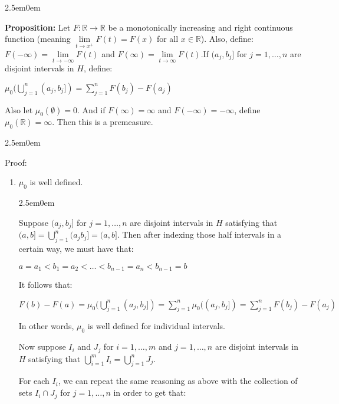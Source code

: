 \documentclass{book}
\newcommand{\hTwo}{%
\color{MidnightBlue}%
   \fontsize{13}{15}\selectfont%
}
\newcommand{\hThree}{%
   \color{PineGreen!85!Orange}
   \fontsize{12}{14}\selectfont%
}
\newcommand{\hFour}{%
   \color{Cyan!80!black}
   \fontsize{12}{14}\selectfont%
}
\newenvironment{myIndent}{%
   \begin{adjustwidth}{2.5em}{0em}%
}{%
   \end{adjustwidth}%
}
\newcommand{\blab}[1]{\textbf{#1}}
\newcommand{\retTwo}{\hfill\bigbreak}
\begin{document}
\begin{myIndent}\hTwo
   \blab{Proposition:} Let $F: \mathbb{R} \longrightarrow \mathbb{R}$ be a monotonically increasing and right continuous function (meaning $\lim\limits_{t\rightarrow x^+}F(t) = F(x)$ for all $x \in \mathbb{R}$). Also, define:\\ [-6pt]\phantom{aaaaaaaaaaaaaaaaaaaaaaaa} $F(-\infty) = \lim\limits_{t\rightarrow -\infty}F(t)$ and $F(\infty) = \lim\limits_{t\rightarrow \infty}F(t)$.\retTwo If $(a_j, b_j]$ for $j = 1,\ldots, n$ are disjoint intervals in $H$, define:

   {\centering $\mu_0(\bigcup\limits_{j=1}^n (a_j, b_j]) = \sum\limits_{j=1}^n F(b_j) - F(a_j)$ \\ [1pt]\par}

   Also let $\mu_0(\emptyset) = 0$. And if $F(\infty) = \infty$ and $F(-\infty) = -\infty$, define $\mu_0(\mathbb{R}) = \infty$. Then this is a premeasure.
   
   \begin{myIndent}\hThree
      Proof:
      \begin{enumerate}
         \item $\mu_0$ is well defined.
         \begin{myIndent}\hFour
            Suppose $(a_j, b_j]$ for $j = 1, \ldots, n$ are disjoint intervals in $H$ satisfying that $(a, b] = \bigcup\limits_{j=1}^n (a_j b_j] = (a, b]$. Then after indexing those half intervals in a\\ certain way, we must have that:\\ [-10pt]

            {\centering $a = a_1 < b_1 = a_2 < \ldots < b_{n-1} = a_{n} < b_{n-1} = b $ \retTwo\par}

            It follows that:
            
            {\centering$F(b) - F(a) = \mu_0(\bigcup\limits_{j=1}^n(a_j, b_j]) = \sum\limits_{j=1}^n \mu_0((a_j, b_j]) = \sum\limits_{j=1}^n F(b_j) - F(a_j) $ \retTwo\par}

            In other words, $\mu_0$ is well defined for individual intervals.\retTwo

            Now suppose $I_i$ and $J_j$ for $i = 1,\ldots,m$ and $j = 1, \ldots, n$ are disjoint intervals in $H$ satisfying that $\bigcup\limits_{i=1}^m I_i = \bigcup\limits_{j=1}^n J_j$.\retTwo
            
            For each $I_i$, we can repeat the same reasoning as above with the collection of sets $I_i \cap J_j$ for $j = 1, \ldots, n$ in order to get that:


\end{myIndent}
\end{enumerate}
\end{myIndent}
\end{myIndent}
\end{document}
